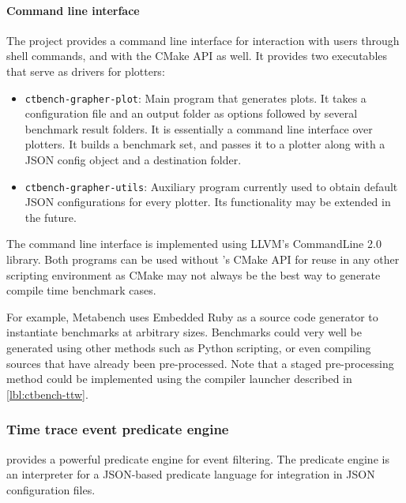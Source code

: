 \documentclass[../../main.tex]{subfiles}
\begin{document}
\paragraph{Command line interface}

The \grapher project provides a command line interface for interaction with
users through shell commands, and with the CMake API as well. It provides two
executables that serve as drivers for \grapher plotters:

\begin{itemize}

\item \lstinline{ctbench-grapher-plot}: Main program that generates plots.
      It takes a configuration file and an output folder as options followed by
      several benchmark result folders.
      It is essentially a command line interface over plotters.
      It builds a benchmark set, and passes it to a plotter along with a JSON
      config object and a destination folder.

\item \lstinline{ctbench-grapher-utils}: Auxiliary program currently used to
      obtain default JSON configurations for every plotter. Its functionality
      may be extended in the future.

\end{itemize}

The command line interface is implemented using LLVM's CommandLine 2.0 library.
Both programs can be used without \ctbench's CMake API for reuse in any other
scripting environment as CMake may not always be the best way to generate \cpp
compile time benchmark cases.

For example, Metabench\cite{metabench} uses Embedded Ruby as a source code
generator to instantiate benchmarks at arbitrary sizes. Benchmarks could very
well be generated using other methods such as Python scripting, or even
compiling \cpp sources that have already been pre-processed. Note that a staged
pre-processing method could be implemented using the compiler launcher described
in \ref{lbl:ctbench-ttw}.

\subsubsection{Time trace event predicate engine}
\label{lbl:grapher-predicate-engine}

\grapher provides a powerful predicate engine for event filtering.
The predicate engine is an interpreter for a JSON-based predicate language for
integration in JSON configuration files.
\end{document}
